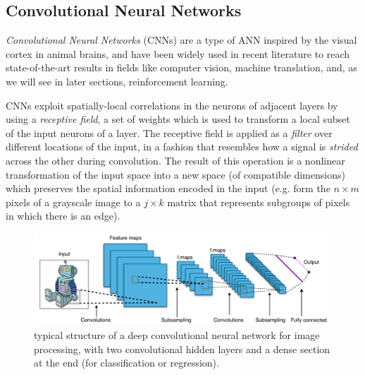 \subsection{Convolutional Neural Networks} \label{s:CNN}
\textit{Convolutional Neural Networks} (CNNs) are a type of ANN inspired by the 
visual cortex in animal brains, and have been widely used in recent literature 
to reach state-of-the-art results in fields like computer vision, machine 
translation, and, as we will see in later sections, reinforcement learning.

CNNs exploit spatially-local correlations in the neurons of adjacent 
layers by using a \textit{receptive field}, a set of weights which is used to 
transform a local subset of the input neurons of a layer.
The receptive field is applied as a \textit{filter} over different locations of 
the input, in a fashion that resembles how a signal is \textit{strided} across 
the other during convolution. 
The result of this operation is a nonlinear transformation of 
the input space into a new space (of compatible dimensions) which preserves
the spatial information encoded in the input (e.g. form the $n \times m$ pixels
of a grayscale image to a $j \times k$ matrix that represents subgroups of 
pixels in which there is an edge).
%
\begin{figure}[h]
\includegraphics[width=	\textwidth]{pictures/CNN}
\centering
\caption{typical structure of a deep convolutional neural network for image
	 processing, with two convolutional hidden layers and a dense section
	 at the end (for classification or regression).}
\end{figure}
%

